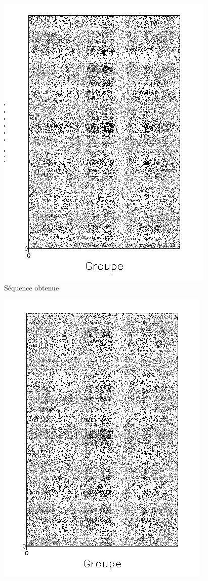 \begin{figure}[!ht]
	\begin{minipage}[r]{.46\linewidth}
		\begin{center}
		\includegraphics[scale=0.7]{../res/cible2.png}
Séquence obtenue	\end{center}
\end{minipage} \hfill
\begin{minipage}[c]{.46 \linewidth}
	\begin{center}
			\includegraphics[scale=0.7]{../res/cible2-ic.png}

\end{center}
\end{minipage}
\end{figure}
